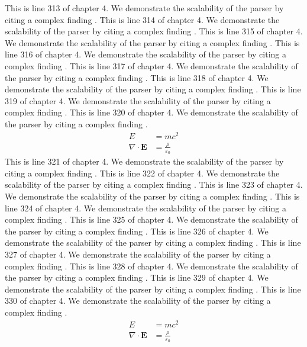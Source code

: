 This is line 313 of chapter 4. We demonstrate the scalability of the parser by citing a complex finding \cite{ref4_313}.
This is line 314 of chapter 4. We demonstrate the scalability of the parser by citing a complex finding \cite{ref4_314}.
This is line 315 of chapter 4. We demonstrate the scalability of the parser by citing a complex finding \cite{ref4_315}.
This is line 316 of chapter 4. We demonstrate the scalability of the parser by citing a complex finding \cite{ref4_316}.
This is line 317 of chapter 4. We demonstrate the scalability of the parser by citing a complex finding \cite{ref4_317}.
This is line 318 of chapter 4. We demonstrate the scalability of the parser by citing a complex finding \cite{ref4_318}.
This is line 319 of chapter 4. We demonstrate the scalability of the parser by citing a complex finding \cite{ref4_319}.
This is line 320 of chapter 4. We demonstrate the scalability of the parser by citing a complex finding \cite{ref4_320}.
\begin{align*}
  E &= mc^2 \\
  \nabla \cdot \mathbf{E} &= \frac{\rho}{\varepsilon_0}
\end{align*}
This is line 321 of chapter 4. We demonstrate the scalability of the parser by citing a complex finding \cite{ref4_321}.
This is line 322 of chapter 4. We demonstrate the scalability of the parser by citing a complex finding \cite{ref4_322}.
This is line 323 of chapter 4. We demonstrate the scalability of the parser by citing a complex finding \cite{ref4_323}.
This is line 324 of chapter 4. We demonstrate the scalability of the parser by citing a complex finding \cite{ref4_324}.
This is line 325 of chapter 4. We demonstrate the scalability of the parser by citing a complex finding \cite{ref4_325}.
This is line 326 of chapter 4. We demonstrate the scalability of the parser by citing a complex finding \cite{ref4_326}.
This is line 327 of chapter 4. We demonstrate the scalability of the parser by citing a complex finding \cite{ref4_327}.
This is line 328 of chapter 4. We demonstrate the scalability of the parser by citing a complex finding \cite{ref4_328}.
This is line 329 of chapter 4. We demonstrate the scalability of the parser by citing a complex finding \cite{ref4_329}.
This is line 330 of chapter 4. We demonstrate the scalability of the parser by citing a complex finding \cite{ref4_330}.
\begin{align*}
  E &= mc^2 \\
  \nabla \cdot \mathbf{E} &= \frac{\rho}{\varepsilon_0}
\end{align*}
